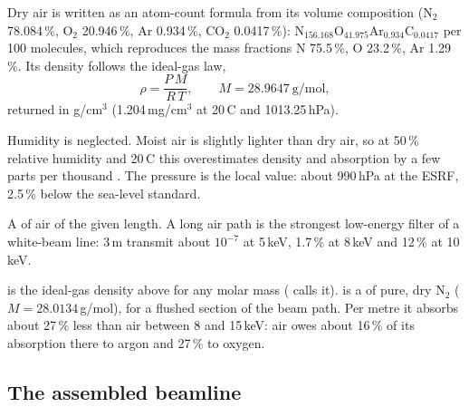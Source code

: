 Dry air is written as an atom-count formula from its volume composition (N$_2$ 78.084\,\%,
O$_2$ 20.946\,\%, Ar 0.934\,\%, CO$_2$ 0.0417\,\%): $\mathrm{N}_{156.168}\mathrm{O}_{41.975}
\mathrm{Ar}_{0.934}\mathrm{C}_{0.0417}$ per 100 molecules, which reproduces the mass fractions
N 75.5\,\%, O 23.2\,\%, Ar 1.29\,\%. Its density follows the ideal-gas law,
\begin{equation}
  \rho = \frac{P\,M}{R\,T}, \qquad M = 28.9647\ \mathrm{g/mol},
\end{equation}
returned in g/cm$^3$ (1.204\,mg/cm$^3$ at 20\,\textdegree C and 1013.25\,hPa).
\begin{hyp}
Humidity is neglected. Moist air is slightly lighter than dry air, so at 50\,\% relative
humidity and 20\,\textdegree C this overestimates density and absorption by a few parts per
thousand \citep{Picard2008}. The pressure is the local value: about 990\,hPa at the ESRF,
2.5\,\% below the sea-level standard.
\end{hyp}

A  of air of the given length. A long air path is the strongest low-energy filter
of a white-beam line: 3\,m transmit about $10^{-7}$ at 5\,keV, 1.7\,\% at 8\,keV and 12\,\% at
10\,keV.

 is the ideal-gas density above for any molar mass ( calls
it).  is a  of pure, dry N$_2$ ($M = 28.0134$\,g/mol), for a flushed
section of the beam path. Per metre it absorbs about 27\,\% less than air between 8 and
15\,keV: air owes about 16\,\% of its absorption there to argon and 27\,\% to oxygen.

\subsection{The assembled beamline}

